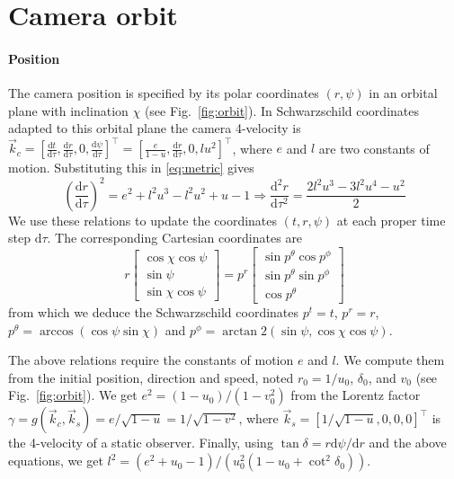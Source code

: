 \documentclass{document}
\newcommand{\diff}{\mathrm d}
\begin{document}
\section{Camera orbit}\label{sec:cameraorbit}

\paragraph*{Position} The camera position is specified by its polar coordinates 
$(r,\psi)$ in an orbital plane with inclination $\chi$ (see 
Fig.~\ref{fig:orbit}). In Schwarzschild coordinates adapted to this orbital 
plane the camera 4-velocity is $\vec{k}_c = [\frac{\diff t}{\diff \tau}, 
\frac{\diff r}{\diff \tau}, 0, \frac{\diff \psi}{\diff \tau}]^\top = 
[\frac{e}{1 - u}, \frac{\diff r}{\diff \tau}, 0, l u^2]^\top$, where $e$ and 
$l$ are two constants of motion. Substituting this in \eqref{eq:metric} gives
\begin{equation*}
\left(\frac{\diff r}{\diff \tau}\right)^2 = e^2 + l^2 u^3 - l^2 u^2 + u - 1
\Rightarrow
\frac{\diff^2 r}{\diff \tau^2} = \frac{2 l^2 u^3 - 3 l^2 u^4 - u^2}{2}
\end{equation*}
We use these relations to update the coordinates $(t, r, \psi)$ at each proper 
time step $\diff \tau$. The corresponding Cartesian coordinates are
\begin{equation*}
r
\begin{bmatrix}
\cos\chi \cos\psi \\
\sin\psi\\
\sin\chi \cos\psi
\end{bmatrix}
=
p^r
\begin{bmatrix}
\sin p^\theta \cos p^\phi\\
\sin p^\theta \sin p^\phi\\
\cos p^\theta
\end{bmatrix}
\end{equation*}
from which we deduce the Schwarzschild coordinates $p^t = t $, $p^r = r$,
$p^\theta = \arccos(\cos\psi \sin\chi)$ and $p^\phi = \arctan2(\sin\psi, 
\cos\chi \cos\psi)$.

The above relations require the constants of motion $e$ and $l$. We compute 
them from the initial position, direction and speed, noted $r_0 = 1 / u_0$, 
$\delta_0$, and $v_0$ (see Fig.~\ref{fig:orbit}). We get $e^2 = (1 - u_0) / (1 
- v_0^2)$ from the Lorentz factor $\gamma = g(\vec{k}_c, \vec{k}_s) = 
e / \sqrt{1 - u} = 1 / \sqrt{1 - v^2}$, where $\vec{k}_s = [1 / \sqrt{1 
- u}, 0, 0, 0]^\top$ is the 4-velocity of a static observer. Finally, using 
$\tan\delta = r \diff\psi / \diff r$ and the above equations, we get $l^2 = 
(e^2 + u_0 - 1) / (u_0^2 (1 - u_0 + \cot^2\delta_0))$.
\end{document}
